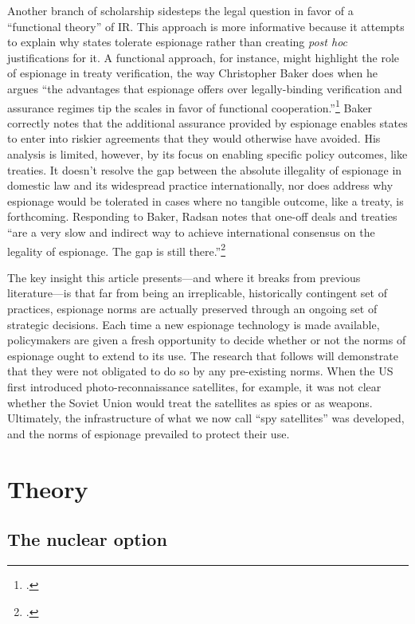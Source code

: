 \documentclass[14pt]{extarticle}
\begin{document}
Another branch of scholarship sidesteps the legal question in favor of a \enquote{functional theory} of IR. This approach is more informative because it attempts to explain why states tolerate espionage rather than creating \emph{post hoc} justifications for it. A functional approach, for instance, might highlight the role of espionage in treaty verification, the way Christopher Baker does when he argues \enquote{the advantages that espionage offers over legally-binding verification and assurance regimes tip the scales in favor of functional cooperation.}\footcite{baker_tolerance_2004} Baker correctly notes that the additional assurance provided by espionage enables states to enter into riskier agreements that they would otherwise have avoided. His analysis is limited, however, by its focus on enabling specific policy outcomes, like treaties. It doesn't resolve the gap between the absolute illegality of espionage in domestic law and its widespread practice internationally, nor does address why espionage would be tolerated in cases where no tangible outcome, like a treaty, is forthcoming. Responding to Baker, Radsan notes that one-off deals and treaties \enquote{are a very slow and indirect way to achieve international consensus on the legality of espionage. The gap is still there.}\footcite[p.~607]{radsan_unresolved_2007}

The key insight this article presents---and where it breaks from previous literature---is that far from being an irreplicable, historically contingent set of practices, espionage norms are actually preserved through an ongoing set of strategic decisions. Each time a new espionage technology is made available, policymakers are given a fresh opportunity to decide whether or not the norms of espionage ought to extend to its use. The research that follows will demonstrate that they were not obligated to do so by any pre-existing norms. When the US first introduced photo-reconnaissance satellites, for example, it was not clear whether the Soviet Union would treat the satellites as spies or as weapons. Ultimately, the infrastructure of what we now call \enquote{spy satellites} was developed, and the norms of espionage prevailed to protect their use.

\section{Theory}
\subsection{The nuclear option}
\end{document}
